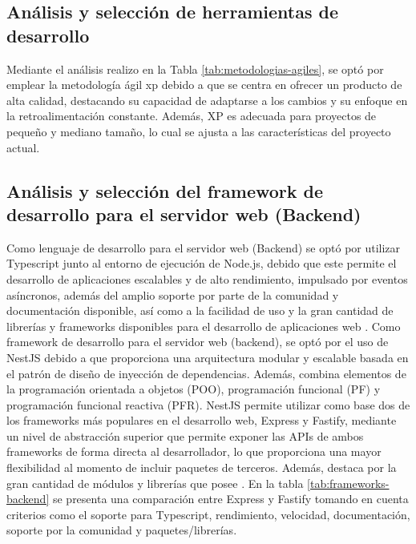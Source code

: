 \subsection{Análisis y selección de herramientas de desarrollo}

Mediante el análisis realizo en la Tabla \ref{tab:metodologias-agiles}, se optó por emplear la metodología ágil
xp debido a que se centra en ofrecer un producto de alta calidad, destacando su capacidad de adaptarse a los cambios
y su enfoque en la retroalimentación constante. Además, XP es adecuada para proyectos de pequeño y mediano tamaño,
lo cual se ajusta a las características del proyecto actual.

\subsection{Análisis y selección del framework de desarrollo para el servidor web (Backend)}

Como lenguaje de desarrollo para el servidor web (Backend) se optó por utilizar Typescript junto al entorno de
ejecución de Node.js, debido que este permite el desarrollo de aplicaciones escalables y de alto rendimiento,
impulsado por eventos asíncronos, además del amplio soporte por parte de la comunidad y documentación disponible,
así como a la facilidad de uso y la gran cantidad de librerías y frameworks disponibles para el desarrollo de aplicaciones
web \cite{haroDesarrolloBackendPara}.
\bigbreak
Como framework de desarrollo para el servidor web (backend), se optó por el uso de NestJS debido a que proporciona
una arquitectura modular y escalable basada en el patrón de diseño de inyección de dependencias. Además, combina
elementos de la programación orientada a objetos (POO), programación funcional (PF) y programación funcional
reactiva (PFR). NestJS permite utilizar como base dos de los frameworks más populares en el desarrollo web, Express y
Fastify, mediante un nivel de abstracción superior que permite exponer las APIs de ambos frameworks de forma
directa al desarrollador, lo que proporciona una mayor flexibilidad al momento de incluir paquetes de terceros.
Además, destaca por la gran cantidad de módulos y librerías que posee \cite{phamDEVELOPINGBACKENDWEB2020}.
\bigbreak
En la tabla \ref{tab:frameworks-backend} se presenta una comparación entre Express y Fastify tomando en cuenta
criterios como el soporte para Typescript, rendimiento, velocidad, documentación, soporte por la comunidad y
paquetes/librerías.



